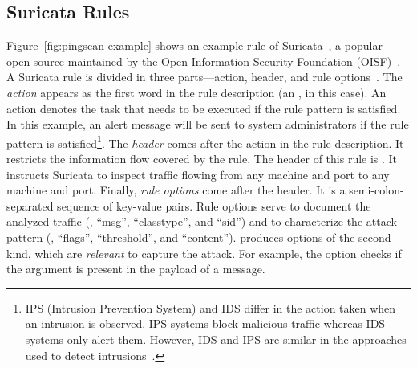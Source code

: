 \documentclass[sigconf,review, anonymous]{acmart}
\begin{document}
\subsection{Suricata Rules}
\label{sec:example-suricata-rules}

Figure~\ref{fig:pingscan-example} shows an example rule of
Suricata~\cite{suricata}, a popular open-source \nids{} maintained by
the Open Information Security Foundation (OISF)~\cite{oisf}.  A
Suricata rule is divided in three parts---action, header, and rule
options~\cite{suri-rule-format}. The \emph{action} appears as the
first word in the rule description (an , in this
case). An action denotes the task that needs to be executed if the
rule pattern is satisfied.  In this example, an alert message will be
sent to system administrators if the rule pattern is
satisfied\footnote{IPS (Intrusion Prevention System) and IDS differ in
  the action taken when an intrusion is observed. IPS systems block
  malicious traffic whereas IDS systems only alert them. However, IDS
  and IPS are similar in the approaches used to detect
  intrusions~\cite{ids-ips}.}. The \emph{header} comes after the
action in the rule description. It restricts the information flow
covered by the rule. The header of this rule is . It instructs Suricata to inspect  traffic
flowing from any machine and port to any machine and port. Finally, \emph{rule options} come after the
header. It is a semi-colon-separated sequence of key-value pairs. Rule
options serve to document the analyzed traffic (\eg{}, ``msg'',
``classtype'', and ``sid'') and to characterize the attack pattern
(\eg, ``flags'', ``threshold'', and ``content''). \tname{} produces
options of the second kind, which are \emph{relevant} to capture the
attack. For example, the option  checks if the
argument is present in the payload of a message.
\end{document}
